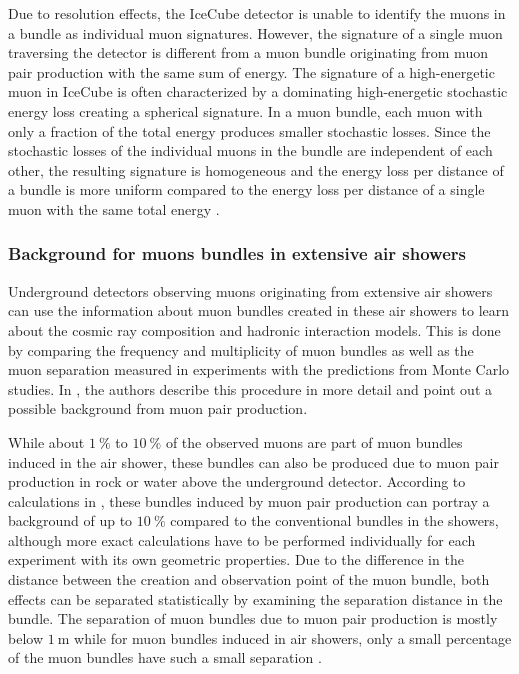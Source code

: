 Due to resolution effects, the IceCube detector is unable to identify the muons in a bundle as individual muon signatures.
However, the signature of a single muon traversing the detector is different from a muon bundle originating from muon pair production with the same sum of energy.
The signature of a high-energetic muon in IceCube is often characterized by a dominating high-energetic stochastic energy loss creating a spherical signature.
In a muon bundle, each muon with only a fraction of the total energy produces smaller stochastic losses.
Since the stochastic losses of the individual muons in the bundle are independent of each other, the resulting signature is homogeneous and the energy loss per distance of a bundle is more uniform compared to the energy loss per distance of a single muon with the same total energy \cite{charmante_myonen}.

\subsubsection{Background for muons bundles in extensive air showers}

Underground detectors observing muons originating from extensive air showers can use the information about muon bundles created in these air showers to learn about the cosmic ray composition and hadronic interaction models.
This is done by comparing the frequency and multiplicity of muon bundles as well as the muon separation measured in experiments with the predictions from Monte Carlo studies.
In \cite{MupairInRock}, the authors describe this procedure in more detail and point out a possible background from muon pair production.

While about $\SI{1}{\percent}$ to $\SI{10}{\percent}$ of the observed muons are part of muon bundles induced in the air shower, these bundles can also be produced due to muon pair production in rock or water above the underground detector.
According to calculations in \cite{MupairInRock}, these bundles induced by muon pair production can portray a background of up to $\SI{10}{\percent}$ compared to the conventional bundles in the showers, although more exact calculations have to be performed individually for each experiment with its own geometric properties.
Due to the difference in the distance between the creation and observation point of the muon bundle, both effects can be separated statistically by examining the separation distance in the bundle.
The separation of muon bundles due to muon pair production is mostly below $\SI{1}{\metre}$ while for muon bundles induced in air showers, only a small percentage of the muon bundles have such a small separation \cite{MupairInRock}.

